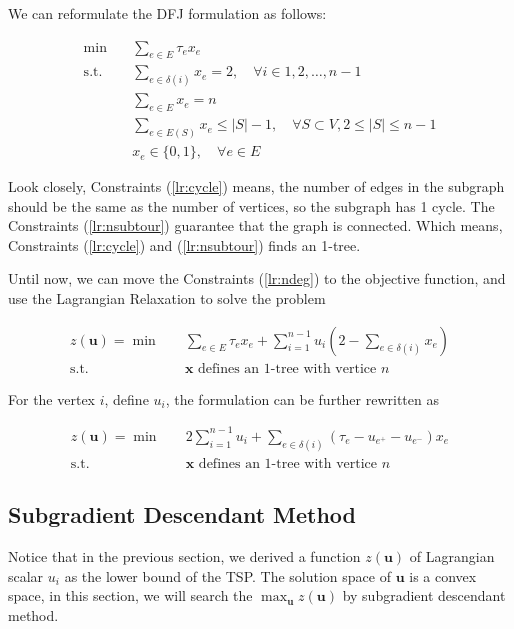             We can reformulate the DFJ formulation as follows:

            \begin{align}
                \min \quad &\sum_{e \in E} \tau_e x_e\\
                \text{s.t.} \quad & \sum_{e \in \delta(i)} x_e = 2, \quad \forall i \in 1, 2, \ldots, n - 1\label{lr:ndeg}\\
                &\sum_{e \in E} x_e = n \label{lr:cycle}\\
                & \sum_{e \in E(S)} x_e \le |S| - 1, \quad \forall S \subset V, 2 \le |S| \le n - 1 \label{lr:nsubtour}\\
                & x_e \in \{0, 1\}, \quad \forall e \in E
            \end{align}

            Look closely, Constraints (\ref{lr:cycle}) means, the number of edges in the subgraph should be the same as the number of vertices, so the subgraph has 1 cycle. The Constraints (\ref{lr:nsubtour}) guarantee that the graph is connected. Which means, Constraints (\ref{lr:cycle}) and (\ref{lr:nsubtour}) finds an 1-tree.

            Until now, we can move the Constraints (\ref{lr:ndeg}) to the objective function, and use the Lagrangian Relaxation to solve the problem

            \begin{align}
                z(\mathbf{u}) = \min \quad & \sum_{e \in E} \tau_e x_e + \sum_{i = 1}^{n - 1}u_i(2 - \sum_{e \in \delta(i)} x_e)\\
                \text{s.t.} \quad & \mathbf{x} \text{ defines an 1-tree with vertice } n
            \end{align}

            For the vertex $i$, define $u_i$, the formulation can be further rewritten as

            \begin{align}
                z(\mathbf{u}) = \min \quad & 2\sum_{i = 1}^{n - 1} u_i + \sum_{e \in \delta(i)} (\tau_e - u_{e^+} - u_{e^-})x_e\\
                \text{s.t.} \quad & \mathbf{x} \text{ defines an 1-tree with vertice } n
            \end{align}

        \subsection{Subgradient Descendant Method}
            Notice that in the previous section, we derived a function $z(\mathbf{u})$ of Lagrangian scalar $u_i$ as the lower bound of the TSP. The solution space of $\mathbf{u}$ is a convex space, in this section, we will search the $\max_{\mathbf{u}} z(\mathbf{u})$ by subgradient descendant method.

